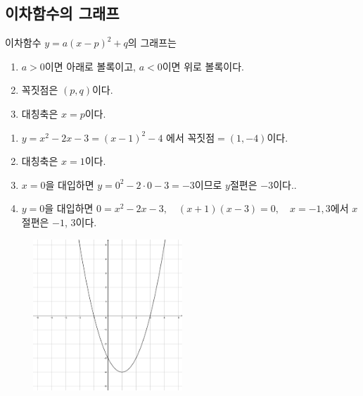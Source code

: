 \documentclass{oblivoir}
\begin{document}
\subsection{이차함수의 그래프}
\begin{mdframed}
%
\theo{}
이차함수 \(y=a(x-p)^2+q\)의 그래프는
\begin{enumerate}
\item
\(a>0\)이면 아래로 볼록이고, \(a<0\)이면 위로 볼록이다.
\item
꼭짓점은 \((p,q)\)이다.
\item
대칭축은 \(x=p\)이다.
\end{enumerate}
\end{mdframed}

%
\begin{mdframed}[skipabove=-20pt]
\begin{enumerate}
\item[\ding{172}]
\(y=x^2-2x-3=(x-1)^2-4\)
에서 \(꼭짓점=(1,-4)\)이다.
\item[\ding{173}]
대칭축은 \(x=1\)이다.
\item[\ding{174}]
\(x=0\)을 대입하면 \(y=0^2-2\cdot0-3=-3\)이므로 \(y\)절편은 \(-3\)이다..
\item[\ding{175}]
\(y=0\)을 대입하면 \(0=x^2-2x-3,\quad(x+1)(x-3)=0,\quad x=-1,3\)에서 \(x\)절편은 \(-1\), \(3\)이다.
\end{enumerate}
\end{mdframed}

\begin{figure}[h!]
\centering
\includegraphics[width=0.5\textwidth]{y=x^2-2x-3}
\end{figure}
\end{document}
